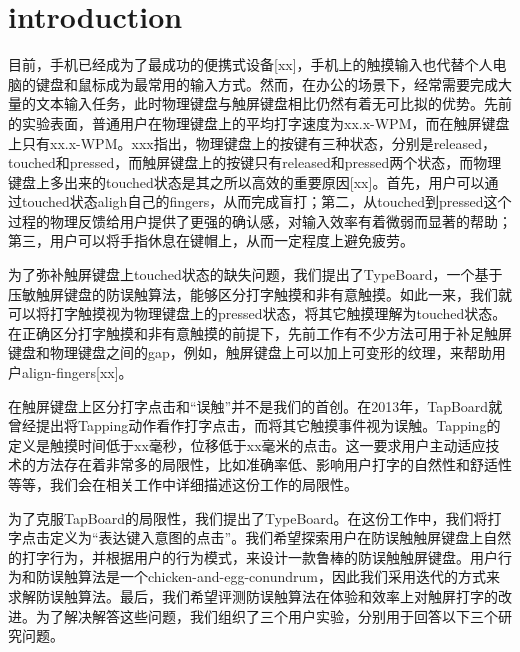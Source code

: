 \section{introduction}

目前，手机已经成为了最成功的便携式设备[xx]，手机上的触摸输入也代替个人电脑的键盘和鼠标成为最常用的输入方式。然而，在办公的场景下，经常需要完成大量的文本输入任务，此时物理键盘与触屏键盘相比仍然有着无可比拟的优势。先前的实验表面，普通用户在物理键盘上的平均打字速度为xx.x-WPM，而在触屏键盘上只有xx.x-WPM。xxx指出，物理键盘上的按键有三种状态，分别是released，touched和pressed，而触屏键盘上的按键只有released和pressed两个状态，而物理键盘上多出来的touched状态是其之所以高效的重要原因[xx]。首先，用户可以通过touched状态aligh自己的fingers，从而完成盲打；第二，从touched到pressed这个过程的物理反馈给用户提供了更强的确认感，对输入效率有着微弱而显著的帮助；第三，用户可以将手指休息在键帽上，从而一定程度上避免疲劳。

为了弥补触屏键盘上touched状态的缺失问题，我们提出了TypeBoard，一个基于压敏触屏键盘的防误触算法，能够区分打字触摸和非有意触摸。如此一来，我们就可以将打字触摸视为物理键盘上的pressed状态，将其它触摸理解为touched状态。在正确区分打字触摸和非有意触摸的前提下，先前工作有不少方法可用于补足触屏键盘和物理键盘之间的gap，例如，触屏键盘上可以加上可变形的纹理，来帮助用户align-fingers[xx]。

在触屏键盘上区分打字点击和“误触”并不是我们的首创。在2013年，TapBoard就曾经提出将Tapping动作看作打字点击，而将其它触摸事件视为误触。Tapping的定义是触摸时间低于xx毫秒，位移低于xx毫米的点击。这一要求用户主动适应技术的方法存在着非常多的局限性，比如准确率低、影响用户打字的自然性和舒适性等等，我们会在相关工作中详细描述这份工作的局限性。

为了克服TapBoard的局限性，我们提出了TypeBoard。在这份工作中，我们将打字点击定义为“表达键入意图的点击”。我们希望探索用户在防误触触屏键盘上自然的打字行为，并根据用户的行为模式，来设计一款鲁棒的防误触触屏键盘。用户行为和防误触算法是一个chicken-and-egg-conundrum，因此我们采用迭代的方式来求解防误触算法。最后，我们希望评测防误触算法在体验和效率上对触屏打字的改进。为了解决解答这些问题，我们组织了三个用户实验，分别用于回答以下三个研究问题。

